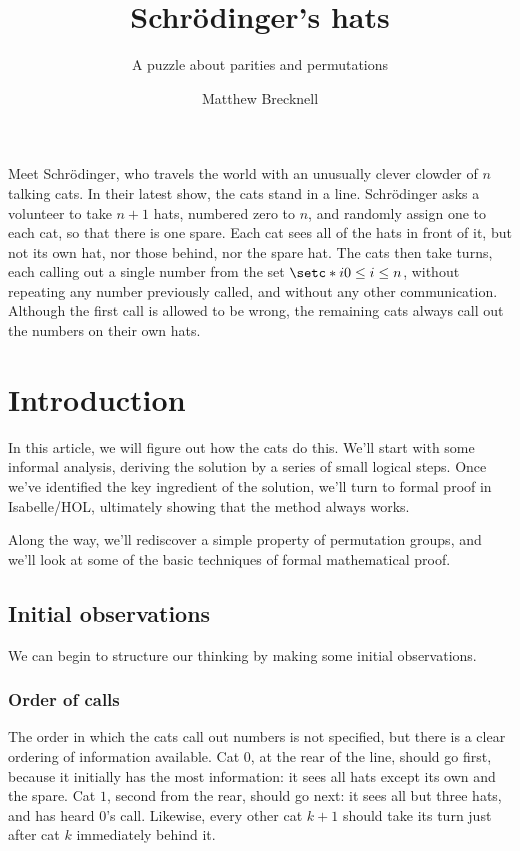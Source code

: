 \documentclass[10pt,a4paper]{scrartcl}
\title{Schr\"odinger's hats}
\subtitle{A puzzle about parities and permutations}
\author{Matthew Brecknell}
\begin{document}
\maketitle

Meet Schr\"odinger, who travels the world with an unusually clever clowder of
$n$ talking cats. In their latest show, the cats stand in a line.
Schr\"odinger asks a volunteer to take $n+1$ hats, numbered zero to $n$, and
randomly assign one to each cat, so that there is one spare. Each cat sees all
of the hats in front of it, but not its own hat, nor those behind, nor the
spare hat. The cats then take turns, each calling out a single number from the
set $\setc*{i}{0 \leq i \leq n}$, without repeating any number previously
called, and without any other communication. Although the first call is allowed
to be wrong, the remaining cats always call out the numbers on their own hats.

\section{Introduction}

In this article, we will figure out how the cats do this. We'll start with some
informal analysis, deriving the solution by a series of small logical steps.
Once we've identified the key ingredient of the solution, we'll turn to formal
proof in Isabelle/HOL, ultimately showing that the method always works.

Along the way, we'll rediscover a simple property of permutation groups, and
we'll look at some of the basic techniques of formal mathematical proof.

\subsection{Initial observations}

We can begin to structure our thinking by making some initial observations.

\subsubsection{Order of calls}

The order in which the cats call out numbers is not specified, but there is a
clear ordering of information available. Cat $0$, at the rear of the line,
should go first, because it initially has the most information: it sees all
hats except its own and the spare. Cat $1$, second from the rear, should go
next: it sees all but three hats, and has heard $0$'s call. Likewise, every
other cat $k+1$ should take its turn just after cat $k$ immediately behind it.
\end{document}
